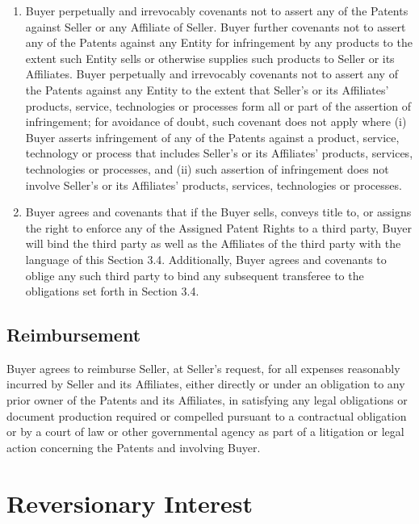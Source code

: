 \documentclass[letterpaper,10pt,openany,oneside,english]{sphinxmanual}
\begin{document}
\begin{enumerate}
\item {} 
Buyer perpetually and irrevocably covenants not to assert any of the Patents against Seller or any Affiliate of Seller. Buyer further covenants not to assert any of the Patents against any Entity for infringement by any products to the extent such Entity sells or otherwise supplies such products to Seller or its Affiliates. Buyer perpetually and irrevocably covenants not to assert any of the Patents against any Entity to the extent that Seller’s or its Affiliates’ products, service, technologies or processes form all or part of the assertion of infringement; for avoidance of doubt, such covenant does not apply where (i) Buyer asserts infringement of any of the Patents against a product, service, technology or process that includes Seller’s or its Affiliates’ products, services, technologies or processes, and (ii) such assertion of infringement does not involve Seller’s or its Affiliates’ products, services, technologies or processes.

\item {} 
Buyer agrees and covenants that if the Buyer sells, conveys title to, or assigns the right to enforce any of the Assigned Patent Rights to a third party, Buyer will bind the third party as well as the Affiliates of the third party with the language of this Section 3.4. Additionally, Buyer agrees and covenants to oblige any such third party to bind any subsequent transferee to the obligations set forth in Section 3.4.

\end{enumerate}


\subsection{Reimbursement}
\label{\detokenize{3-transfer:reimbursement}}
Buyer agrees to reimburse Seller, at Seller’s request, for all expenses reasonably incurred by Seller and its Affiliates, either directly or under an obligation to any prior owner of the Patents and its Affiliates, in satisfying any legal obligations or document production required or compelled pursuant to a contractual obligation or by a court of law or other governmental agency as part of a litigation or legal action concerning the Patents and involving Buyer.


\section{Reversionary Interest}
\label{\detokenize{4-reversionary:reversionary-interest}}\label{\detokenize{4-reversionary::doc}}
\end{document}
